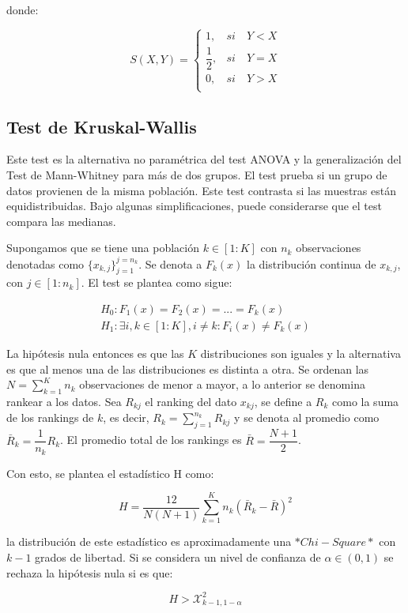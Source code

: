 donde:

$$
S(X,Y)=\begin{cases}1, &si\quad Y<X\\ 
\dfrac{1}{2}, &si\quad Y=X\\
0, &si\quad Y>X\\\end{cases}
$$

\subsection{Test de Kruskal-Wallis}

Este test es la alternativa no paramétrica del test ANOVA y la generalización del Test de Mann-Whitney para más de dos grupos. El test prueba si un grupo de datos provienen de la misma población. Este test contrasta si las muestras están equidistribuidas. Bajo algunas simplificaciones, puede considerarse que el test compara las medianas.

Supongamos que se tiene una población $k\in [1:K]$ con $n_k$ observaciones denotadas como $\{x_{k, j}\}_{j=1}^{j=n_k}$. Se denota a $F_k(x)$ la distribución continua de $x_{k, j}$, con  $j\in [1:n_k]$. El test se plantea como sigue:


\begin{align}
H_0: F_1(x)=F_2(x)=...=F_k(x)\\
H_1:\exists i,k\in [1:K], i\neq k: F_i(x)\neq F_k(x)\end{align}

La hipótesis nula entonces es que las $K$ distribuciones son iguales y la alternativa es que al menos una de las distribuciones es distinta a otra. Se ordenan las $N=\sum\limits_{k=1}^{K}n_k$ observaciones de menor a mayor, a lo anterior se denomina rankear a los datos. Sea $R_{kj}$ el ranking del dato $x_{kj}$, se define a $R_k$ como la suma de los rankings de $k$, es decir, $R_k=\sum\limits_{j=1}^{n_k}R_{kj}$ y se denota al promedio como $\bar{R}_k=\dfrac{1}{n_k}R_k$. El promedio total de los rankings es $\bar{R}=\dfrac{N+1}{2}$.

Con esto, se plantea el estadístico H como:

$$
H=\dfrac{12}{N(N+1)}\sum\limits_{k=1}^K n_k(\bar{R}_k-\bar{R})^2
$$

la distribución de este estadístico es aproximadamente una $*Chi-Square*$ con $k-1$ grados de libertad. Si se considera un nivel de confianza de $\alpha\in (0,1)$  se rechaza la hipótesis nula si es que:

$$
H>\mathcal{X}^2_{k-1, 1-\alpha}
$$

